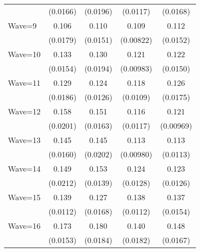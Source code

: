 {\begin{tabular}{l*{4}{c}}
                    &    (0.0166)         &    (0.0196)         &    (0.0117)         &    (0.0168)         \\
[1em]
Wave=9              &       0.106\sym{***}&       0.110\sym{***}&       0.109\sym{***}&       0.112\sym{***}\\
                    &    (0.0179)         &    (0.0151)         &   (0.00822)         &    (0.0152)         \\
[1em]
Wave=10             &       0.133\sym{***}&       0.130\sym{***}&       0.121\sym{***}&       0.122\sym{***}\\
                    &    (0.0154)         &    (0.0194)         &   (0.00983)         &    (0.0150)         \\
[1em]
Wave=11             &       0.129\sym{***}&       0.124\sym{***}&       0.118\sym{***}&       0.126\sym{***}\\
                    &    (0.0186)         &    (0.0126)         &    (0.0109)         &    (0.0175)         \\
[1em]
Wave=12             &       0.158\sym{***}&       0.151\sym{***}&       0.116\sym{***}&       0.121\sym{***}\\
                    &    (0.0201)         &    (0.0163)         &    (0.0117)         &   (0.00969)         \\
[1em]
Wave=13             &       0.145\sym{***}&       0.145\sym{***}&       0.113\sym{***}&       0.113\sym{***}\\
                    &    (0.0160)         &    (0.0202)         &   (0.00980)         &    (0.0113)         \\
[1em]
Wave=14             &       0.149\sym{***}&       0.153\sym{***}&       0.124\sym{***}&       0.123\sym{***}\\
                    &    (0.0212)         &    (0.0139)         &    (0.0128)         &    (0.0126)         \\
[1em]
Wave=15             &       0.139\sym{***}&       0.127\sym{***}&       0.138\sym{***}&       0.137\sym{***}\\
                    &    (0.0112)         &    (0.0168)         &    (0.0112)         &    (0.0154)         \\
[1em]
Wave=16             &       0.173\sym{***}&       0.180\sym{***}&       0.140\sym{***}&       0.148\sym{***}\\
                    &    (0.0153)         &    (0.0184)         &    (0.0182)         &    (0.0167)         \\

\end{tabular}}
